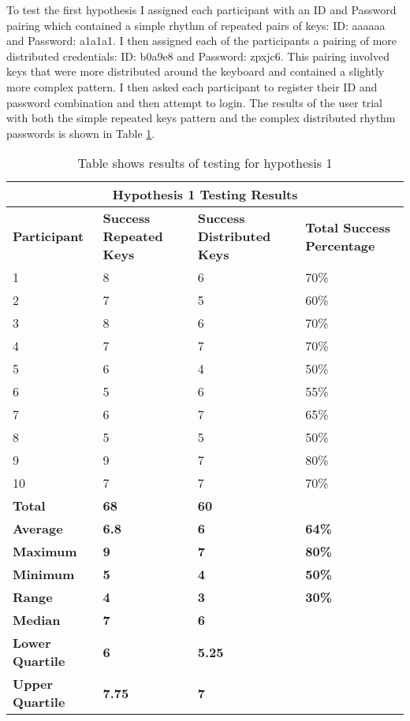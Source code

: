 \documentclass{article}
\begin{document}
To test the first hypothesis I assigned each participant with an ID and Password pairing which contained a simple rhythm of repeated pairs of keys: ID: aaaaaa and Password: a1a1a1. I then assigned each of the participants a pairing of more distributed credentials: ID: b0a9e8 and Password: zpxjc6. This pairing involved keys that were more distributed around the keyboard and contained a slightly more complex pattern. I then asked each participant to register their ID and password combination and then attempt to login. The results of the user trial with both the simple repeated keys pattern and the complex distributed rhythm passwords is shown in Table \ref{table:1}. 

{
\begin{table} [H]
\centering
\begin{tabular}{ |p{2cm}|p{4cm}|p{4cm}| p{4cm} | }
\hline
\multicolumn{4}{|c|}{\textbf{Hypothesis 1 Testing Results}} \\
\hline
\textbf{Participant} & \textbf{Success Repeated Keys} & \textbf{Success Distributed Keys} & \textbf{Total Success Percentage} \\
\hline
1 & 8 & 6 & 70\% \\
\hline
2 & 7 & 5 & 60\% \\
\hline
3 & 8 & 6 & 70\% \\
\hline
4 & 7 & 7 & 70\%  \\
\hline
5 & 6 & 4 & 50\% \\
\hline
6 & 5 & 6 & 55\% \\
\hline
7 & 6 & 7 & 65\% \\
\hline
8 & 5 & 5 & 50\% \\
\hline
9 & 9 & 7 & 80\% \\
\hline
10 & 7 & 7 & 70\% \\
\hline
\textbf{Total} & \textbf{68} & \textbf{60} & \\
\hline
\textbf{Average} & \textbf{6.8} & \textbf{6} & \textbf{64\%} \\
\hline
\textbf{Maximum} & \textbf{9} & \textbf{7} & \textbf{80\%} \\
\hline
\textbf{Minimum} & \textbf{5} & \textbf{4} & \textbf{50\%} \\
\hline
\textbf{Range} & \textbf{4} & \textbf{3} & \textbf{30\%} \\
\hline
\textbf{Median} & \textbf{7} & \textbf{6} & \\
\hline
\textbf{Lower Quartile} & \textbf{6} & \textbf{5.25} & \\
\hline
\textbf{Upper Quartile} & \textbf{7.75} & \textbf{7} & \\
\hline
\end{tabular}
\caption{Table shows results of testing for hypothesis 1}
\label{table:1}
\end{table}
}
\end{document}
